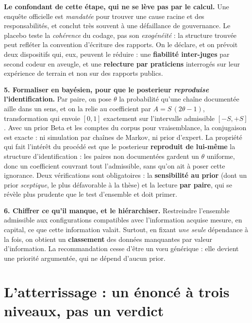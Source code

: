 \documentclass[11pt,a4paper]{article}
\begin{document}
\begin{cle}[colback=accent!7,colframe=accent!70!black]
\textbf{Le confondant de cette étape, qui ne se lève pas par le calcul.} Une enquête officielle
est \emph{mandatée} pour trouver une cause racine et des responsabilités, et conclut très souvent
à une défaillance de gouvernance. Le placebo teste la \emph{cohérence} du codage, pas son
\emph{exogénéité} : la structure trouvée peut refléter la convention d'écriture des rapports. On
le déclare, et on prévoit deux dispositifs qui, eux, peuvent le réduire : une \textbf{fiabilité
inter-juges} par second codeur en aveugle, et une \textbf{relecture par praticiens} interrogés sur
leur expérience de terrain et non sur des rapports publics.
\end{cle}

\textbf{5. Formaliser en bayésien, pour que le posterieur \emph{reproduise} l'identification.}
Par paire, on pose $\theta$ la probabilité qu'une chaîne documentée aille dans un sens, et on la
relie au coefficient par $A = S\,(2\theta-1)$, transformation qui envoie $[0,1]$ exactement sur
l'intervalle admissible $[-S,+S]$. Avec un prior Beta et les comptes du corpus pour vraisemblance,
la conjugaison est exacte : ni simulation par chaînes de Markov, ni prior d'expert. La propriété
qui fait l'intérêt du procédé est que le posterieur \textbf{reproduit de lui-même} la structure
d'identification : les paires non documentées gardent un $\theta$ uniforme, donc un coefficient
couvrant tout l'admissible, sans qu'on ait à poser cette ignorance. Deux vérifications sont
obligatoires : la \textbf{sensibilité au prior} (dont un prior \emph{sceptique}, le plus
défavorable à la thèse) et la lecture \textbf{par paire}, qui se révèle plus prudente que le test
d'ensemble et doit primer.

\textbf{6. Chiffrer ce qu'il manque, et le hiérarchiser.} Restreindre l'ensemble admissible aux
configurations compatibles avec l'information acquise mesure, en capital, ce que cette information
valait. Surtout, en fixant \emph{une seule} dépendance à la fois, on obtient un \textbf{classement}
des données manquantes par valeur d'information. La recommandation cesse d'être un v\oe u
générique : elle devient une priorité argumentée, qui ne dépend d'aucun prior.

\section*{L'atterrissage : un énoncé à trois niveaux, pas un verdict}
\end{document}
